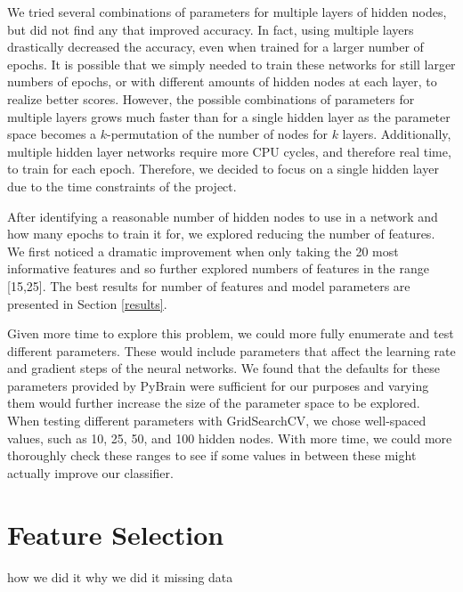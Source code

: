 \documentclass{article}
\begin{document}
We tried several combinations of parameters for multiple layers of hidden nodes, but did not find any that improved accuracy.
In fact, using multiple layers drastically decreased the accuracy, even when trained for a larger number of epochs.
It is possible that we simply needed to train these networks for still larger numbers of epochs, or with different amounts of hidden nodes at each layer, to realize better scores.
However, the possible combinations of parameters for multiple layers grows much faster than for a single hidden layer as the parameter space becomes a $k$-permutation of the number of nodes for $k$ layers.
Additionally, multiple hidden layer networks require more CPU cycles, and therefore real time, to train for each epoch.
Therefore, we decided to focus on a single hidden layer due to the time constraints of the project.

After identifying a reasonable number of hidden nodes to use in a network and how many epochs to train it for, we explored reducing the number of features.
We first noticed a dramatic improvement when only taking the 20 most informative features and so further explored numbers of features in the range [15,25].
The best results for number of features and model parameters are presented in Section \ref{results}.

Given more time to explore this problem, we could more fully enumerate and test different parameters.
These would include parameters that affect the learning rate and gradient steps of the neural networks.
We found that the defaults for these parameters provided by PyBrain were sufficient for our purposes and varying them would further increase the size of the parameter space to be explored.
When testing different parameters with GridSearchCV, we chose well-spaced values, such as 10, 25, 50, and 100 hidden nodes.
With more time, we could more thoroughly check these ranges to see if some values in between these might actually improve our classifier.



\section{Feature Selection}
how we did it
why we did it
  missing data

\end{document}
